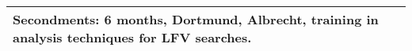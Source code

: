 \begin{center}
{\begin{tabular}{|p{21mm}|p{19mm}|p{15mm}|p{8mm}p{12mm}|p{19mm}|p{39mm}|p{37mm}|}
\multicolumn{8}{|p{20.2cm}|}{\textbf{\Tstrut Secondments:} 6 months, Dortmund, Albrecht, training in analysis techniques for LFV searches.
}\tabularnewline
\hline
\end{tabular}
}%
\end{center}
%
